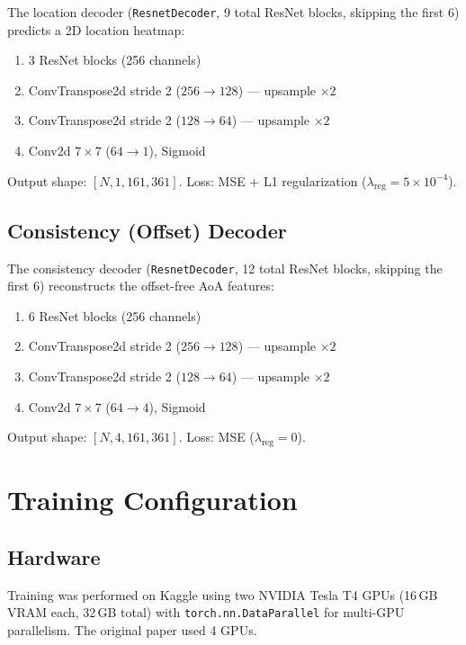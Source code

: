 \documentclass[12pt,a4paper]{article}
\begin{document}
The location decoder (\texttt{ResnetDecoder}, 9 total ResNet blocks, skipping the first 6) predicts a 2D location heatmap:

\begin{enumerate}[nosep]
    \item 3 ResNet blocks (256 channels)
    \item ConvTranspose2d stride 2 ($256 \to 128$) --- upsample $\times 2$
    \item ConvTranspose2d stride 2 ($128 \to 64$) --- upsample $\times 2$
    \item Conv2d $7 \times 7$ ($64 \to 1$), Sigmoid
\end{enumerate}

Output shape: $[N, 1, 161, 361]$. Loss: MSE + L1 regularization ($\lambda_{\text{reg}} = 5 \times 10^{-4}$).

\subsection{Consistency (Offset) Decoder}

The consistency decoder (\texttt{ResnetDecoder}, 12 total ResNet blocks, skipping the first 6) reconstructs the offset-free AoA features:

\begin{enumerate}[nosep]
    \item 6 ResNet blocks (256 channels)
    \item ConvTranspose2d stride 2 ($256 \to 128$) --- upsample $\times 2$
    \item ConvTranspose2d stride 2 ($128 \to 64$) --- upsample $\times 2$
    \item Conv2d $7 \times 7$ ($64 \to 4$), Sigmoid
\end{enumerate}

Output shape: $[N, 4, 161, 361]$. Loss: MSE ($\lambda_{\text{reg}} = 0$).

\section{Training Configuration}

\subsection{Hardware}

Training was performed on Kaggle using two NVIDIA Tesla T4 GPUs (16\,GB VRAM each, 32\,GB total) with \texttt{torch.nn.DataParallel} for multi-GPU parallelism. The original paper used 4 GPUs.
\end{document}
